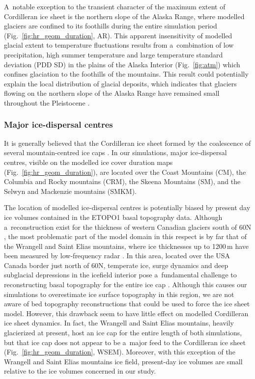 \documentclass[tc, manuscript]{copernicus}
\begin{document}
      A~notable exception to the transient character of the maximum extent
      of Cordilleran ice sheet is the northern slope of the Alaska Range,
      where modelled glaciers are confined to its foothills during the
      entire simulation period (Fig.~\ref{fig:hr_geom_duration}, AR). This
      apparent insensitivity of modelled glacial extent to temperature
      fluctuations results from a~combination of low precipitation, high
      summer temperature and large temperature standard deviation (PDD SD)
      in the plains of the Alaska Interior (Fig.~\ref{fig:atm}) which
      confines glaciation to the foothills of the mountains. This result
      could potentially explain the local distribution of glacial deposits,
      which indicates that glaciers flowing on the northern slope of the
      Alaska Range have remained small throughout the Pleistocene
      \citep{Kaufman.Manley.2004}.

\subsubsection{Major ice-dispersal centres}

      It is generally believed that the Cordilleran ice sheet formed by the
      coalescence of several mountain-centred ice caps
      \citep{Davis.Mathews.1944}. In our simulations, major ice-dispersal
      centres, visible on the modelled ice cover duration maps
      (Fig.~\ref{fig:hr_geom_duration}), are located over the Coast
      Mountains (CM), the Columbia and Rocky mountains (CRM), the Skeena
      Mountains (SM), and the Selwyn and Mackenzie mountains (SMKM).

      The location of modelled ice-dispersal centres is potentially biased
      by present day ice volumes contained in the ETOPO1 basal topography
      data. Although a~reconstruction exist for the thickness of western
      Canadian glaciers south of 60{\degree}N \citep{Clarke.etal.2013}, the
      most problematic part of the model domain in this respect is by far
      that of the Wrangell and Saint Elias mountains, where ice thicknesses
      up to 1200\,m have been measured by low-frequency radar
      \citep{Rignot.etal.2013}. In this area, located over the USA Canada
      border just north of 60{\degree}N, temperate ice, surge dynamics and
      deep subglacial depressions in the icefield interior pose
      a~fundamental challenge to reconstructing basal topography for the
      entire ice cap \citep{Rignot.etal.2013}. Although this causes our
      simulations to overestimate ice surface topography in this region, we
      are not aware of bed topography reconstructions that could be used to
      force the ice sheet model. However, this drawback seem to have
      little effect on modelled Cordilleran ice sheet dynamics. In fact, the
      Wrangell and Saint Elias mountains, heavily glacierized at present,
      host an ice cap for the entire length of both simulations, but that
      ice cap does not appear to be a~major feed to the Cordilleran ice
      sheet (Fig.~\ref{fig:hr_geom_duration}, WSEM). Moreover, with this
      exception of the Wrangell and Saint Elias mountains ice field,
      present-day ice volumes are small relative to the ice volumes
      concerned in our study.
\end{document}
